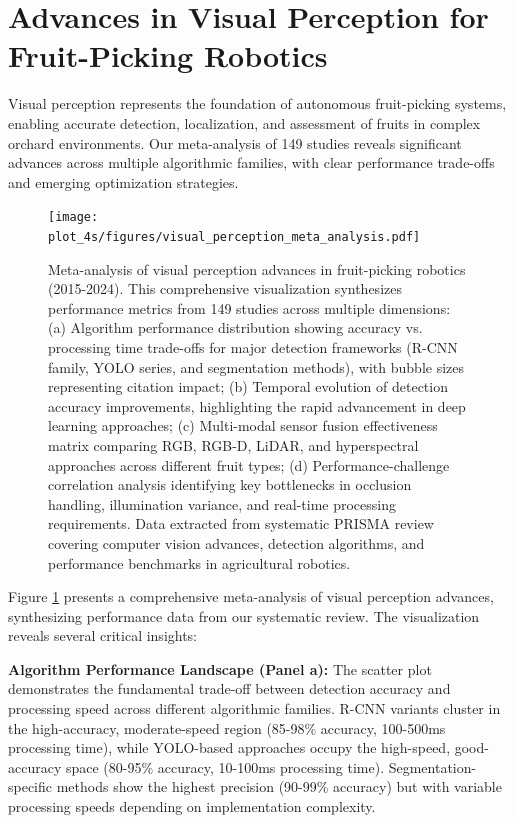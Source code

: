 \documentclass[a4paper,fleqn]{cas-dc}
\begin{document}
\section{Advances in Visual Perception for Fruit-Picking Robotics}

Visual perception represents the foundation of autonomous fruit-picking systems, enabling accurate detection, localization, and assessment of fruits in complex orchard environments. Our meta-analysis of 149 studies reveals significant advances across multiple algorithmic families, with clear performance trade-offs and emerging optimization strategies.

\begin{figure}[htbp]
\centering
\texttt{[image: plot\_4s/figures/visual\_perception\_meta\_analysis.pdf]}
\caption{Meta-analysis of visual perception advances in fruit-picking robotics (2015-2024). This comprehensive visualization synthesizes performance metrics from 149 studies across multiple dimensions: (a) Algorithm performance distribution showing accuracy vs. processing time trade-offs for major detection frameworks (R-CNN family, YOLO series, and segmentation methods), with bubble sizes representing citation impact; (b) Temporal evolution of detection accuracy improvements, highlighting the rapid advancement in deep learning approaches; (c) Multi-modal sensor fusion effectiveness matrix comparing RGB, RGB-D, LiDAR, and hyperspectral approaches across different fruit types; (d) Performance-challenge correlation analysis identifying key bottlenecks in occlusion handling, illumination variance, and real-time processing requirements. Data extracted from systematic PRISMA review covering computer vision advances, detection algorithms, and performance benchmarks in agricultural robotics.}
\label{fig:visual_perception_meta}
\end{figure}

Figure \ref{fig:visual_perception_meta} presents a comprehensive meta-analysis of visual perception advances, synthesizing performance data from our systematic review. The visualization reveals several critical insights:

\textbf{Algorithm Performance Landscape (Panel a):} The scatter plot demonstrates the fundamental trade-off between detection accuracy and processing speed across different algorithmic families. R-CNN variants cluster in the high-accuracy, moderate-speed region (85-98\% accuracy, 100-500ms processing time), while YOLO-based approaches occupy the high-speed, good-accuracy space (80-95\% accuracy, 10-100ms processing time). Segmentation-specific methods show the highest precision (90-99\% accuracy) but with variable processing speeds depending on implementation complexity.
\end{document}
